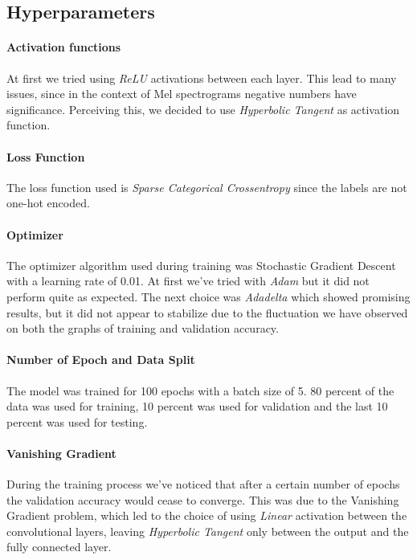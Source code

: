 \documentclass{article}
\begin{document}
    \subsection{Hyperparameters}
    \paragraph{Activation functions}
    At first we tried using \emph{ReLU} activations between each layer. This lead to many issues,
    since in the context of Mel spectrograms negative numbers have significance. Perceiving this,
    we decided to use \emph{Hyperbolic Tangent} as activation function.

    \paragraph{Loss Function}
    The loss function used is \emph{Sparse Categorical Crossentropy} since the labels are not one-hot encoded.

    \paragraph{Optimizer}
    The optimizer algorithm used during training was Stochastic Gradient Descent with a learning rate of 0.01.
    At first we've tried with \emph{Adam} but it did not perform quite as expected. The next choice
    was \emph{Adadelta} which showed promising results, but it did not appear to stabilize due to the
    fluctuation we have observed on both the graphs of training and validation accuracy.

    \paragraph{Number of Epoch and Data Split}
    The model was trained for 100 epochs with a batch size of 5. 80 percent of the data was used
    for training, 10 percent was used for validation and the last 10 percent was used for testing.

    \paragraph{Vanishing Gradient}

    During the training process we've noticed that after a certain number of epochs
    the validation accuracy would cease to converge. This was due to the Vanishing
    Gradient problem, which led to the choice of using \emph{Linear} activation between the
    convolutional layers, leaving \emph{Hyperbolic Tangent} only between the output and
    the fully connected layer.
\end{document}
